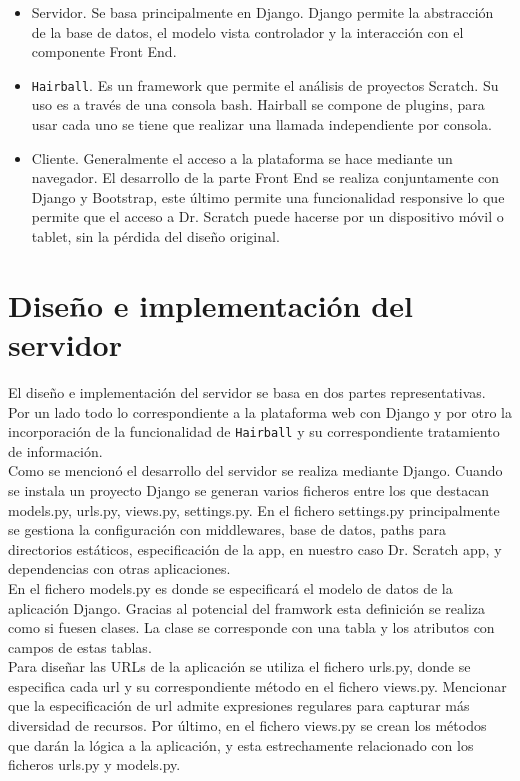 \documentclass[a4paper, 12pt]{book}
\begin{document}
\begin{itemize}
  \item Servidor. Se basa principalmente en Django. Django permite la abstracción de la
	base de datos, el modelo vista controlador y la interacción con el componente Front End.
  \item \texttt{Hairball}. Es un framework que permite el análisis de proyectos Scratch. Su uso es
	a través de una consola bash. Hairball se compone de plugins, para usar cada uno se
	tiene que realizar una llamada independiente por consola.
  \item Cliente. Generalmente el acceso a la plataforma se hace mediante un navegador. El
	desarrollo de la parte Front End se realiza conjuntamente con Django y Bootstrap, este
	último permite una funcionalidad responsive lo que permite que el acceso a Dr. Scratch
	puede hacerse por un dispositivo móvil o tablet, sin la pérdida del diseño original. 
\end{itemize}



\section{Diseño e implementación del servidor}
\label{sec:servidor}

El diseño e implementación del servidor se basa en dos partes representativas. Por un lado todo lo
correspondiente a la plataforma web con Django y por otro la incorporación de la funcionalidad de
\texttt{Hairball} y su correspondiente tratamiento de información. \\

Como se mencionó el desarrollo del servidor se realiza mediante Django. Cuando se instala un proyecto
Django se generan varios ficheros entre los que destacan models.py, urls.py, views.py, settings.py.
En el fichero settings.py principalmente se gestiona la configuración con middlewares, base de datos,
paths para directorios estáticos, especificación de la app, en nuestro caso Dr. Scratch app, y 
dependencias con otras aplicaciones. \\

En el fichero models.py es donde se especificará el modelo de datos de la aplicación Django. Gracias 
al potencial del framwork esta definición se realiza como si fuesen clases. La clase se corresponde 
con una tabla y los atributos con campos de estas tablas. \\

Para diseñar las URLs de la aplicación se utiliza el fichero urls.py, donde se especifica cada url y
su correspondiente método en el fichero views.py. Mencionar que la especificación de url admite 
expresiones regulares para capturar más diversidad de recursos.
Por último, en el fichero views.py se crean los métodos que darán la lógica a la aplicación, y esta
estrechamente relacionado con los ficheros urls.py y models.py.
\end{document}
